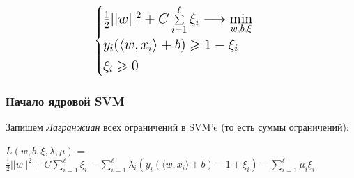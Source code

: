             
            \begin{equation*}
            \Large
                \begin{cases}
                    \frac{1}{2}||w||^2 + C \sum\limits_{i = 1}^\ell\xi_i \longrightarrow \min\limits_{w, b, \xi}\\

                    y_i(\langle w, x_i \rangle + b) \geq 1 - \xi_i \\
                     
                    \xi_i \geq 0
                \end{cases}
            \end{equation*}

    \subsubsection{Начало ядровой SVM}

        Запишем \textit{Лагранжиан} всех ограничений в SVM'e (то есть суммы ограничений):

        \begin{center}
        \Large
            $L(w, b, \xi, \lambda, \mu)$ = $\frac{1}{2}||w||^2 + C \sum\limits_{i = 1}^\ell\xi_i - \sum\limits_{i = 1}^\ell \lambda_i (y_i(\langle w, x_i \rangle + b) - 1 + \xi_i) - \sum\limits_{i = 1}^\ell \mu_i \xi_i$
        \end{center}

